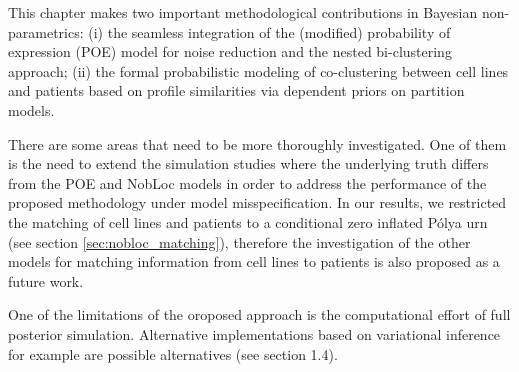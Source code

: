 This chapter makes two important methodological contributions in Bayesian non-parametrics: (i) the seamless integration of the (modified) probability of expression (POE) model for noise reduction and the nested bi-clustering approach; (ii) the formal probabilistic modeling of co-clustering between cell lines and patients based on profile similarities via dependent priors on partition models.

There are some areas that need to be more thoroughly investigated. One of them is the need to extend the simulation studies where the underlying truth differs from the POE and NobLoc models in order to address the performance of the proposed methodology under model misspecification. In our results, we restricted the matching of cell lines and patients to a conditional zero inflated P\'olya urn (see section \ref{sec:nobloc_matching}), therefore the investigation of the other models for matching information from cell lines to patients is also proposed as a future work.

One of the limitations of the oroposed approach is the computational effort of full posterior simulation. Alternative implementations based on variational inference for example are possible alternatives (see section 1.4).